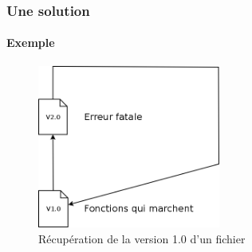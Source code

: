 	\begin{frame}
		\frametitle{Une solution}
		\framesubtitle{Exemple}
		\begin{figure}
			\centering
			\includegraphics[width=60mm]{./Img/RevertFich.png}
			\caption{Récupération de la  version 1.0 d'un fichier}
		\end{figure}
	\end{frame}




